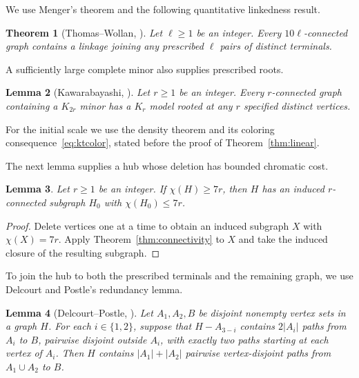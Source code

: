 \documentclass[11pt]{article}
\newtheorem{theorem}{Theorem}
\newtheorem{lemma}[theorem]{Lemma}
\begin{document}
We use Menger's theorem and the following quantitative linkedness result.
\begin{theorem}[Thomas--Wollan, {\cite[Theorem~5.6 and the following remark]{DP}}]
\label{thm:linked}
Let $\ell\ge1$ be an integer. Every $10\ell$-connected graph contains
a linkage joining any prescribed $\ell$ pairs of distinct terminals.
\end{theorem}

A sufficiently large complete minor also supplies prescribed roots.
\begin{lemma}[Kawarabayashi, {\cite[Lemma~5.14]{DP}}]\label{lem:rooted}
Let $r\ge1$ be an integer. Every $r$-connected graph containing a
$K_{2r}$ minor has a $K_r$ model rooted at any $r$ specified distinct
vertices.
\end{lemma}

For the initial scale we use the density theorem and its coloring
consequence~\eqref{eq:ktcolor}, stated before the proof of
Theorem~\ref{thm:linear}.

The next lemma supplies a hub whose deletion has bounded chromatic cost.
\begin{lemma}\label{lem:hub}
Let $r\ge1$ be an integer. If $\chi(H)\ge7r$, then $H$ has an
induced $r$-connected subgraph $H_0$ with $\chi(H_0)\le7r$.
\end{lemma}
\begin{proof}
Delete vertices one at a time to obtain an induced subgraph $X$ with
$\chi(X)=7r$. Apply Theorem~\ref{thm:connectivity} to $X$ and take the
induced closure of the resulting subgraph.
\end{proof}

To join the hub to both the prescribed terminals and the remaining graph,
we use Delcourt and Postle's redundancy lemma.
\begin{lemma}[Delcourt--Postle, {\cite[Lemma~5.3]{DP}}]
\label{lem:redundancy}
Let $A_1,A_2,B$ be disjoint nonempty vertex sets in a graph $H$.
For each $i\in\{1,2\}$, suppose that $H-A_{3-i}$ contains $2|A_i|$
paths from $A_i$ to $B$, pairwise disjoint outside $A_i$, with exactly
two paths starting at each vertex of $A_i$.
Then $H$ contains $|A_1|+|A_2|$ pairwise vertex-disjoint paths from
$A_1\cup A_2$ to $B$.
\end{lemma}
\end{document}
